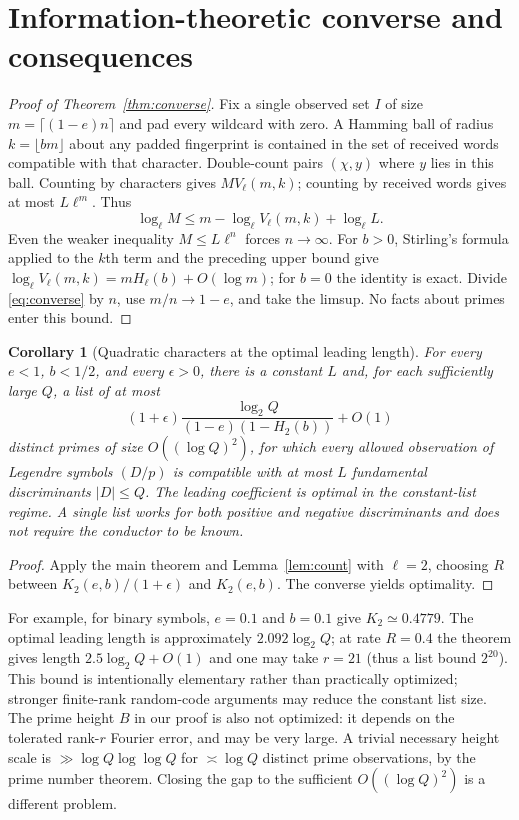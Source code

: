 \documentclass[11pt]{article}
\newtheorem{corollary}[theorem]{Corollary}
\theoremstyle{remark}\newtheorem{remark}[theorem]{Remark}
\begin{document}
\section{Information-theoretic converse and consequences}
\begin{proof}[Proof of Theorem~\ref{thm:converse}]
Fix a single observed set $I$ of size $m=\lceil(1-e)n\rceil$ and pad every wildcard with zero. A Hamming ball of radius $k=\lfloor bm\rfloor$ about any padded fingerprint is contained in the set of received words compatible with that character. Double-count pairs $(\chi,y)$ where $y$ lies in this ball. Counting by characters gives $MV_\ell(m,k)$; counting by received words gives at most $L\ell^m$. Thus
\begin{equation}\label{eq:converse}
 \log_\ell M\le m-\log_\ell V_\ell(m,k)+\log_\ell L.
\end{equation}
Even the weaker inequality $M\le L\ell^n$ forces $n\to\infty$. For $b>0$, Stirling's formula applied to the $k$th term and the preceding upper bound give $\log_\ell V_\ell(m,k)=mH_\ell(b)+O(\log m)$; for $b=0$ the identity is exact. Divide \eqref{eq:converse} by $n$, use $m/n\to1-e$, and take the limsup. No facts about primes enter this bound.
\end{proof}

\begin{corollary}[Quadratic characters at the optimal leading length]\label{cor:quad}
For every $e<1$, $b<1/2$, and every $\epsilon>0$, there is a constant $L$ and, for each sufficiently large $Q$, a list of at most
\[
 (1+\epsilon)\frac{\log_2 Q}{(1-e)(1-H_2(b))}+O(1)
\]
distinct primes of size $O((\log Q)^2)$, for which every allowed observation of Legendre symbols $(D/p)$ is compatible with at most $L$ fundamental discriminants $|D|\le Q$. The leading coefficient is optimal in the constant-list regime. A single list works for both positive and negative discriminants and does not require the conductor to be known.
\end{corollary}
\begin{proof}
Apply the main theorem and Lemma~\ref{lem:count} with $\ell=2$, choosing $R$ between $K_2(e,b)/(1+\epsilon)$ and $K_2(e,b)$. The converse yields optimality.
\end{proof}

For example, for binary symbols, $e=0.1$ and $b=0.1$ give $K_2\simeq0.4779$. The optimal leading length is approximately $2.092\log_2 Q$; at rate $R=0.4$ the theorem gives length $2.5\log_2 Q+O(1)$ and one may take $r=21$ (thus a list bound $2^{20}$). This bound is intentionally elementary rather than practically optimized; stronger finite-rank random-code arguments may reduce the constant list size. The prime height $B$ in our proof is also not optimized: it depends on the tolerated rank-$r$ Fourier error, and may be very large. A trivial necessary height scale is $\gg\log Q\log\log Q$ for $\asymp\log Q$ distinct prime observations, by the prime number theorem. Closing the gap to the sufficient $O((\log Q)^2)$ is a different problem.
\end{document}
